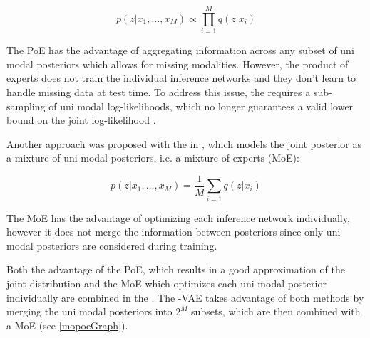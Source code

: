 \begin{equation}
    p(z|x_1,\ldots,x_M) \propto \prod ^M _{i=1} q(z|x_i)
\end{equation}

The PoE has the advantage of aggregating information across any subset of uni modal posteriors which allows for missing modalities.
However, the product of experts does not train the individual inference networks and they don't learn to handle missing data at test time.
To address this issue, the  requires a sub-sampling of uni modal log-likelihoods, which no longer guarantees a valid lower bound on the joint log-likelihood \parencite{wu_multimodal_2019}.

Another approach was proposed with the  in \cite{shi2019variational}, which models the joint posterior as a mixture of uni modal posteriors, i.e. a mixture of experts (MoE):

\begin{equation}
    p(z|x_1,\ldots,x_M) = \frac{1}{M} \sum _{i=1} q(z|x_i)
\end{equation}

The MoE has the advantage of optimizing each inference network individually, however it does not merge the information between posteriors since only uni modal posteriors are considered during training.

Both the advantage of the PoE, which results in a good approximation of the joint distribution and the MoE which optimizes each uni modal posterior individually are combined in the  \parencite{thomas_gener-ELBO}.
The -VAE takes advantage of both methods by merging the uni modal posteriors into $2^M$ subsets, which are then combined with a MoE (see \cref{mopoeGraph}).


